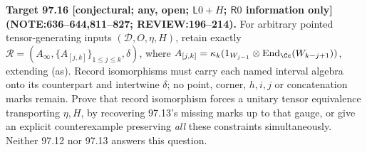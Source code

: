 \textbf{Target 97.16 [conjectural; any, open; \(\mathsf L0+H\); \(\mathsf R0\) information only] (NOTE:636--644,811--827; REVIEW:196--214).}
For arbitrary pointed tensor-generating inputs \((\mathcal D,O,\eta,H)\), retain exactly
\(\mathcal R=(A_\infty,\{A_{[j,k]}\}_{1\le j\le k},\delta)\), where
\(A_{[j,k]}=\kappa_k(1_{W_{j-1}}\otimes\operatorname{End}_\Cc(W_{k-j+1}))\), extending (as).
Record isomorphisms must carry each named interval algebra onto its counterpart and intertwine \(\delta\);
no point, corner, \(h,i,j\) or concatenation marks remain. Prove that record isomorphism forces a unitary tensor
equivalence transporting \(\eta,H\), by recovering 97.13's missing marks up to that gauge, or give an explicit
counterexample preserving \emph{all} these constraints simultaneously. Neither 97.12 nor 97.13 answers this question.
